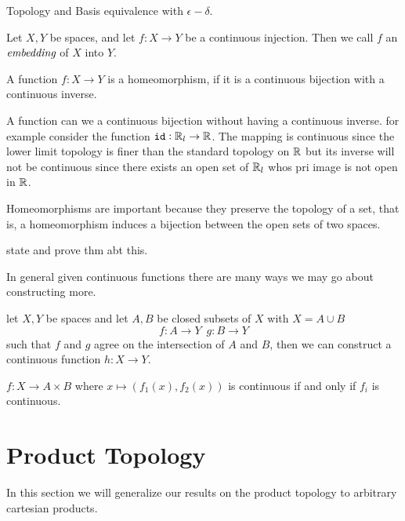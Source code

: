 \begin{chapter}{Topology and Basis}
   equivalence with $\epsilon-\delta$. 

   
   \begin{defn}
    Let $X, Y$ be spaces, and let $f:X \to Y$ be a continuous injection. Then we call $f$ an $\emph{embedding}$ 
    of $X$ into $Y$. 
   \end{defn}

   \begin{defn}
    A function $f:X \to Y$ is a homeomorphism, if it is a continuous bijection with a continuous inverse. 
   \end{defn}

   
   \begin{ex}
    A function can we a continuous bijection without having a continuous inverse. for example 
    consider the function ${\tt id}:\mathbb{R}_l \to \mathbb{R}$. The mapping is continuous since the lower limit topology 
    is finer than the standard topology on $\mathbb{R}$ but its inverse will not be continuous since there exists 
    an open set of $\mathbb{R}_l$ whos pri image is not open in $\mathbb{R}$. 
   \end{ex}


    Homeomorphisms are important because they preserve the topology of a set, that is, a homeomorphism induces a bijection 
    between the open sets of two spaces. 

   state and prove thm abt this. 

   In general given continuous functions there are many  ways we may go about constructing more. 




   
   \begin{thm}
    let $X, Y$ be spaces and let $A,B$ be closed subsets of $X$ with $X = A \cup B$
    \[f:A \to Y \, \, \, g:B \to Y\]
    such that $f$ and $g$ agree on the intersection of $A$ and $B$, 
    then we can construct a continuous function $h:X \to Y$. 
   \end{thm}


   \begin{thm}
    $f:X \to A \times B$ where $x \mapsto (f_1(x), f_2(x))$ 
    is continuous if and only if $f_i$ is continuous. 
   \end{thm}

   \section{Product Topology}
   In this section we will generalize our results on the product topology to arbitrary cartesian products. 


    
\end{chapter}
